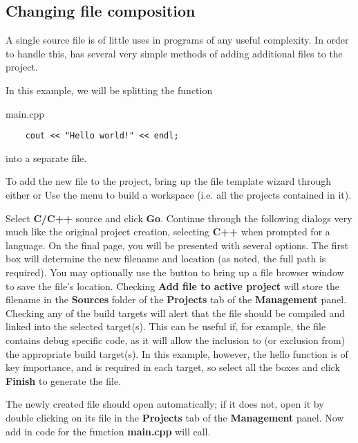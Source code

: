 \subsection{Changing file composition}

A single source file is of little uses in programs of any useful complexity. In order to handle this, \codeblocks has several very simple methods of adding additional files to the project.


In this example, we will be splitting the function

main.cpp
\begin{lstlisting}
    cout << "Hello world!" << endl;
\end{lstlisting}

into a separate file.


To add the new file to the project, bring up the file template wizard through either  or  
Use the menu  to build a workspace (i.e. all the projects contained in it). 

Select \textbf{C/C++} source and click \textbf{Go}. Continue through the following dialogs very much like the original project creation, selecting \textbf{C++} when prompted for a language. On the final page, you will be presented with several options. The first box will determine the new filename and location (as noted, the full path is required). You may optionally use the  button to bring up a file browser window to save the file's location. Checking \textbf{Add file to active project} will store the filename in the \textbf{Sources} folder of the \textbf{Projects} tab of the \textbf{Management} panel. Checking any of the build targets will alert \codeblocks that the file should be compiled and linked into the selected target(s). This can be useful if, for example, the file contains debug specific code, as it will allow the inclusion to (or exclusion from) the appropriate build target(s). In this example, however, the hello function is of key importance, and is required in each target, so select all the boxes and click \textbf{Finish} to generate the file.

The newly created file should open automatically; if it does not, open it by double clicking on its file in the \textbf{Projects} tab of the \textbf{Management} panel. Now add in code for the function \textbf{main.cpp} will call.

